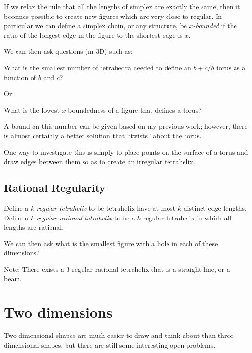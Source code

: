 \documentclass[11pt]{article}
\begin{document}
If we relax the rule that all the lengths of simplex are exactly the same, then it becomes possible to create new figures which are
very close to regular. In particular we can define a simplex chain, or any structure, be {\em $x$-bounded} if the ratio of the longest edge
in the figure to the shortest edge is $x$.

We can then ask questions (in 3D) such as:

What is the smallest number of tetrahedra needed to define an $b+c/b$ torus as a function of $b$ and $c$?

Or:

What is the lowest $x$-boundedness of a figure that defines a torus?

A bound on this number can be given based on my previous work; however, there is almost certainly a better solution that ``twists'' about the torus.

One way to investigate this is simply to place points on the surface of a torus and draw edges between them so as to create an irregular tetrahelix.

\subsection{Rational Regularity}

Define a {\em $k$-regular tetrahelix} to be tetrahelix have at most $k$ distinct edge lengths.
Define a {\em $k$-regular rational tetrahelix} to be a $k$-regular tetrahelix in which all lengths are rational.

We can then ask what is the smallest figure with a hole in each of these dimensions?

Note: There exists a 3-regular rational tetrahelix that is a straight line, or a beam.


\section{Two dimensions}

Two-dimensional shapes are much easier to draw and think about than three-dimensional shapes, but there are still
some interesting open problems.
\end{document}
